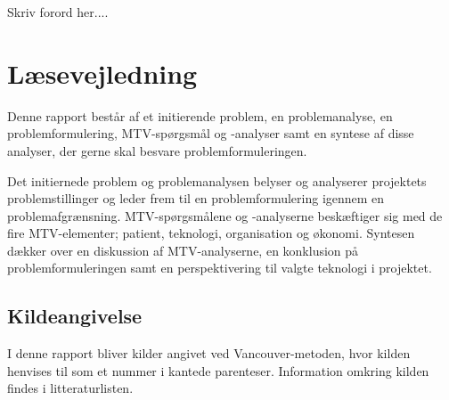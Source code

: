 Skriv forord her.... 


\section*{Læsevejledning}
Denne rapport består af et initierende problem, en problemanalyse, en problemformulering, MTV-spørgsmål og -analyser samt en syntese af disse analyser, der gerne skal besvare problemformuleringen. 

Det initiernede problem og problemanalysen belyser og analyserer projektets problemstillinger og leder frem til en problemformulering igennem en problemafgrænsning. MTV-spørgsmålene og -analyserne beskæftiger sig med de fire MTV-elementer; patient, teknologi, organisation og økonomi. Syntesen dækker over en diskussion af MTV-analyserne, en konklusion på problemformuleringen samt en perspektivering til valgte teknologi i projektet. 


\subsection*{Kildeangivelse}
I denne rapport bliver kilder angivet ved Vancouver-metoden, hvor kilden henvises til som et nummer i kantede parenteser. Information omkring kilden findes i litteraturlisten.












